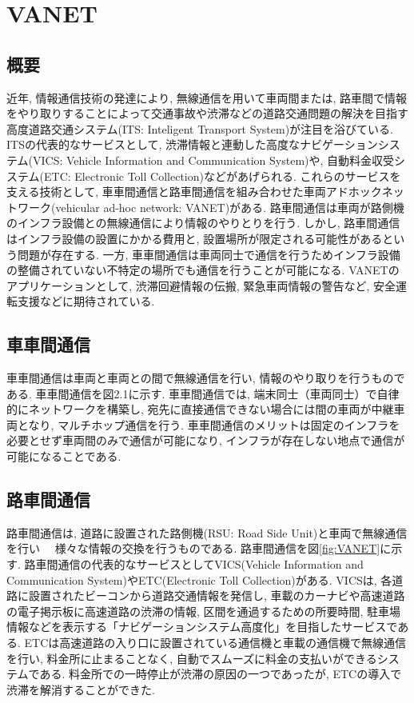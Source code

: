 \documentclass[10pt]{jreport}
\begin{document}
\chapter{VANET}
\label{Related}
\vspace{-5mm}
\section{概要}
近年, 情報通信技術の発達により, 無線通信を用いて車両間または, 路車間で情報をやり取りすることによって交通事故や渋滞などの道路交通問題の解決を目指す高度道路交通システム(ITS: Inteligent Transport System)が注目を浴びている\cite{1}. ITSの代表的なサービスとして, 渋滞情報と連動した高度なナビゲーションシステム(VICS: Vehicle Information and Communication System)\cite{VICS}や, 自動料金収受システム(ETC: Electronic Toll Collection)\cite{ETC}などがあげられる. これらのサービスを支える技術として, 車車間通信と路車間通信を組み合わせた車両アドホックネットワーク(vehicular ad-hoc network: VANET)がある. 路車間通信は車両が路側機のインフラ設備との無線通信により情報のやりとりを行う. しかし, 路車間通信はインフラ設備の設置にかかる費用と, 設置場所が限定される可能性があるという問題が存在する. 一方, 車車間通信は車両同士で通信を行うためインフラ設備の整備されていない不特定の場所でも通信を行うことが可能になる. VANETのアプリケーションとして, 渋滞回避情報の伝搬, 緊急車両情報の警告など, 安全運転支援などに期待されている. 
\section{車車間通信}
車車間通信は車両と車両との間で無線通信を行い, 情報のやり取りを行うものである. 車車間通信を図2.1に示す. 車車間通信では, 端末同士（車両同士）で自律的にネットワークを構築し, 宛先に直接通信できない場合には間の車両が中継車両となり, マルチホップ通信を行う. 車車間通信のメリットは固定のインフラを必要とせず車両間のみで通信が可能になり, インフラが存在しない地点で通信が可能になることである. 

\section{路車間通信}
路車間通信は, 道路に設置された路側機(RSU: Road Side Unit)と車両で無線通信を行い　
様々な情報の交換を行うものである. 路車間通信を図\ref{fig:VANET}に示す.  路車間通信の代表的なサービスとしてVICS(Vehicle Information and Communication System)やETC(Electronic Toll Collection)がある. VICSは, 各道路に設置されたビーコンから道路交通情報を発信し, 車載のカーナビや高速道路の電子掲示板に高速道路の渋滞の情報, 区間を通過するための所要時間, 駐車場情報などを表示する「ナビゲーションシステム高度化」を目指したサービスである. ETCは高速道路の入り口に設置されている通信機と車載の通信機で無線通信を行い, 料金所に止まることなく, 自動でスムーズに料金の支払いができるシステムである. 料金所での一時停止が渋滞の原因の一つであったが, ETCの導入で渋滞を解消することができた. 
\end{document}
